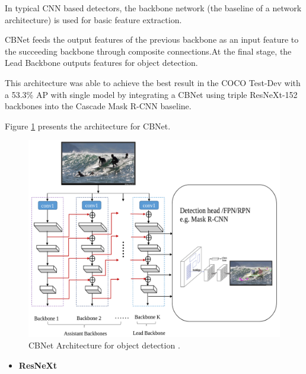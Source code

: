 \par In typical CNN based detectors, the backbone network (the baseline of a network architecture) is used for basic feature extraction.

\par CBNet feeds the output features of the previous backbone as an input feature to the succeeding backbone through composite connections.At the final stage, the Lead Backbone outputs features for object detection.

\par This architecture was able to achieve the best result in the COCO Test-Dev with a 53.3\% AP with single model by integrating a CBNet using triple ResNeXt-152 \cite{Xie2017} backbones into the Cascade Mask R-CNN baseline.


\par Figure \ref{fig:cbnet} presents the architecture for CBNet.



\begin{figure}[H]
    \centering
    \includegraphics[scale = 0.25]{Sections/2StateOfTheArt/2_images/cbnet.png}
    \caption{CBNet Architecture for object detection \cite{Liu2019}.} 
    \label{fig:cbnet}
\end{figure}


\begin{itemize}
    \item \textbf{ResNeXt}
\end{itemize}

